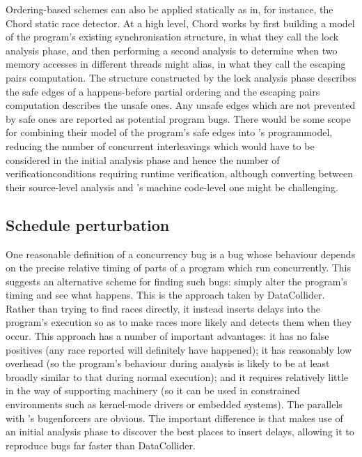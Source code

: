 Ordering-based schemes can also be applied statically as in, for
instance, the Chord static race detector\cite{Naik2006}.  At a high
level, Chord works by first building a model of the program's existing
synchronisation structure, in what they call the lock analysis phase,
and then performing a second analysis to determine when two memory
accesses in different threads might alias, in what they call the
escaping pairs computation.  The structure constructed by the lock
analysis phase describes the safe edges of a happens-before partial
ordering and the escaping pairs computation describes the unsafe ones.
Any unsafe edges which are not prevented by safe ones are reported as
potential program bugs.  There would be some scope for combining their
model of the program's safe edges into {\technique}'s
\gls{programmodel}, reducing the number of concurrent interleavings
which would have to be considered in the initial analysis phase and
hence the number of \glspl{verificationcondition} requiring runtime
verification, although converting between their source-level analysis
and {\technique}'s machine code-level one might be challenging.

\subsection{Schedule perturbation}

One reasonable definition of a concurrency bug is a bug whose
behaviour depends on the precise relative timing of parts of a program
which run concurrently.  This suggests an alternative scheme for
finding such bugs: simply alter the program's timing and see what
happens.  This is the approach taken by
DataCollider\cite{Erickson2010}.  Rather than trying to find races
directly, it instead inserts delays into the program's execution so as
to make races more likely and detects them when they occur.  This
approach has a number of important advantages: it has no false
positives (any race reported will definitely have happened); it has
reasonably low overhead (so the program's behaviour during analysis is
likely to be at least broadly similar to that during normal
execution); and it requires relatively little in the way of supporting
machinery (so it can be used in constrained environments such as
kernel-mode drivers or embedded systems).  The parallels with
{\technique}'s \glspl{bugenforcer} are obvious.  The important
difference is that {\technique} makes use of an initial analysis phase
to discover the best places to insert delays, allowing it to reproduce
bugs far faster than DataCollider.

